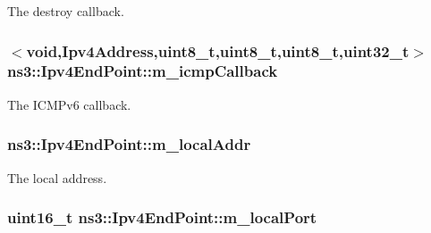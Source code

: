 The destroy callback. 

\subsubsection[{\texorpdfstring{m\+\_\+icmp\+Callback}{m_icmpCallback}}]{$<$void,{\bf Ipv4\+Address},uint8\+\_\+t,uint8\+\_\+t,uint8\+\_\+t,uint32\+\_\+t$>$ ns3\+::\+Ipv4\+End\+Point\+::m\+\_\+icmp\+Callback\hspace{0.3cm}{\ttfamily [private]}}\hypertarget{classns3_1_1Ipv4EndPoint_a422148fb2d2d931558ac69c55d80c01c}{}\label{classns3_1_1Ipv4EndPoint_a422148fb2d2d931558ac69c55d80c01c}


The I\+C\+M\+Pv6 callback. 

\subsubsection[{\texorpdfstring{m\+\_\+local\+Addr}{m_localAddr}}]{ ns3\+::\+Ipv4\+End\+Point\+::m\+\_\+local\+Addr\hspace{0.3cm}{\ttfamily [private]}}\hypertarget{classns3_1_1Ipv4EndPoint_ac31b3a095613982a9008b70efeaf5103}{}\label{classns3_1_1Ipv4EndPoint_ac31b3a095613982a9008b70efeaf5103}


The local address. 

\subsubsection[{\texorpdfstring{m\+\_\+local\+Port}{m_localPort}}]{\setlength{\rightskip}{0pt plus 5cm}uint16\+\_\+t ns3\+::\+Ipv4\+End\+Point\+::m\+\_\+local\+Port\hspace{0.3cm}{\ttfamily [private]}}\hypertarget{classns3_1_1Ipv4EndPoint_a55501f3aacd292d00041ec4c2e2134de}{}\label{classns3_1_1Ipv4EndPoint_a55501f3aacd292d00041ec4c2e2134de}


